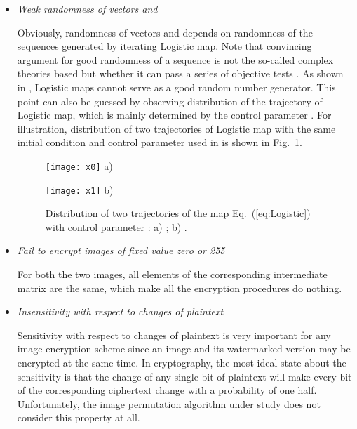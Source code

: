 \documentclass[3p,preprint,11pt]{elsarticle}
\newlength\imagewidth
\begin{document}
\begin{itemize}
\item \textit{Weak randomness of vectors  and }

Obviously, randomness of vectors  and  depends
on randomness of the sequences generated by iterating Logistic map.
Note that convincing argument for good randomness of a sequence is
not the so-called complex theories based but whether it can pass a
series of objective tests \cite{Rukhin:TestPRNG:NIST}. As shown in
\cite[Sec. 3.1]{Li:AttackingBitshiftXOR2007}, Logistic maps cannot
serve as a good random number generator. This point can also be
guessed by observing distribution of the trajectory of Logistic map,
which is mainly determined by the control parameter \cite{Kaiwang:PLASymbolic2009}.
For illustration, distribution of two trajectories of Logistic map with
the same initial condition and control parameter used in \cite[Sec.
2]{Ye:Scramble:PRL10} is shown in
Fig.~\ref{fig:distribute4logistic}.

\begin{figure}[!htb]
\centering
\begin{minipage}[t]{\imagewidth}
\centering
\texttt{[image: x0]}
a)
\end{minipage}
\begin{minipage}[t]{\imagewidth}
\centering
\texttt{[image: x1]}
b)
\end{minipage}
\caption{Distribution of two trajectories of the map
Eq.~(\ref{eq:Logistic}) with control parameter : a)
; b) .} \label{fig:distribute4logistic}
\end{figure}

\item \textit{Fail to encrypt images of fixed value zero or 255}

For both the two images, all elements of the corresponding intermediate matrix
 are the same, which make all the encryption procedures do nothing.

\item \textit{Insensitivity with respect to changes of plaintext}

Sensitivity with respect to changes of plaintext is very important
for any image encryption scheme since an image and its watermarked
version may be encrypted at the same time. In cryptography, the most
ideal state about the sensitivity is that the change of any single
bit of plaintext will make every bit of the corresponding ciphertext
change with a probability of one half. Unfortunately, the image
permutation algorithm under study does not consider this property at
all.


\end{itemize}
\end{document}
